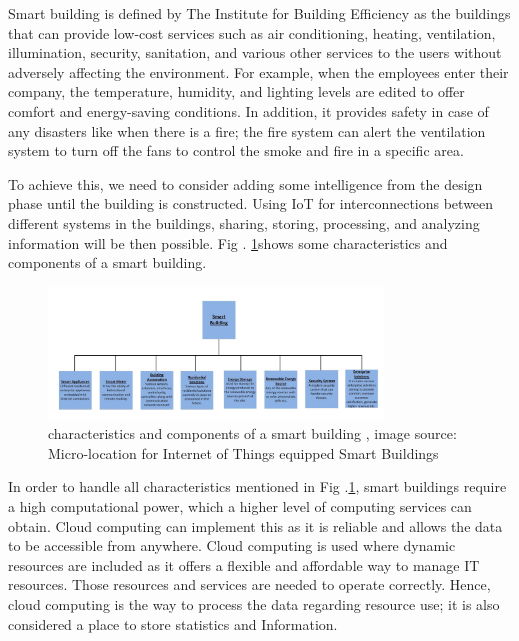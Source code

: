 \documentclass[conference]{IEEEtran}
\begin{document}
Smart building is defined by The Institute for Building Efficiency \cite{smartB} \cite{mic}as the buildings that can provide low-cost services such as air conditioning, heating, ventilation, illumination, security, sanitation, and various other services to the users without adversely affecting the environment. For example, when the employees enter their company, the temperature, humidity, and lighting levels are edited to offer comfort and energy-saving conditions. In addition, it provides safety in case of any disasters like when there is a fire; the fire system can alert the ventilation system to turn off the fans to control the smoke and fire in a specific area.


To achieve this, we need to consider adding some intelligence from the design phase until the building is constructed. Using IoT for interconnections between different systems in the buildings, sharing, storing, processing, and analyzing information will be  then possible. Fig . \ref{char}shows some characteristics and components
of a smart building. 



\begin{figure}[h!]
	\centering
	\includegraphics[width=3.5in]{charsb.png}
	\caption{\label{char}  characteristics and components
of a smart building
		, image source: Micro-location for Internet of Things equipped
Smart Buildings
		\cite{mic} }
\end{figure}


In order to handle all characteristics mentioned in Fig .\ref{char}, smart buildings require a high computational power, which a higher level of computing services can obtain. Cloud computing can implement this as it is reliable and allows the data to be accessible from anywhere. Cloud computing is used where dynamic resources are included as it offers a flexible and affordable way to manage IT resources. Those resources and services are needed to operate correctly. Hence, cloud computing is the way to process the data regarding resource use; it is also considered a place to store statistics and Information. \cite{frame}
\end{document}

